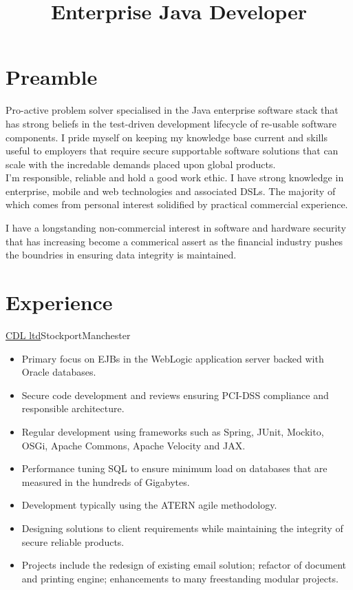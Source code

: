 \documentclass[a4paper,10pt]{moderncv}
\title{Enterprise Java Developer}
\newcommand\weblink[2] {{\color{href} \href{#1}{#2}}}
\begin{document}
\maketitle

\section{Preamble}
Pro-active problem solver specialised in the Java enterprise software stack that has strong beliefs in the test-driven development lifecycle of re-usable software components.
I pride myself on keeping my knowledge base current and skills useful to employers that require secure supportable software solutions that can scale with the incredable demands placed upon global products.\\

I'm responsible, reliable and hold a good work ethic.
I have strong knowledge in enterprise, mobile and web technologies and associated DSLs. The majority of which comes from personal interest solidified by practical commercial experience.

I have a longstanding non-commercial interest in software and hardware security that has increasing become a commerical assert as the financial industry pushes the boundries in ensuring data integrity is maintained.

\section{Experience}

{\weblink{http://www.cdl.co.uk}{CDL ltd}}{Stockport}{Manchester}{
\begin{itemize}
  \item Primary focus on EJBs in the WebLogic application server backed with Oracle databases.
  \item Secure code development and reviews ensuring PCI-DSS compliance and responsible architecture.
  \item Regular development using frameworks such as Spring, JUnit, Mockito, OSGi, Apache Commons, Apache Velocity and JAX.
  \item Performance tuning SQL to ensure minimum load on databases that are measured in the hundreds of Gigabytes.
  \item Development typically using the ATERN agile methodology.
  \item Designing solutions to client requirements while maintaining the integrity of secure reliable products.
  \item Projects include the redesign of existing email solution; refactor of document and printing engine; enhancements to many freestanding modular projects.
\end{itemize}
}
\end{document}

